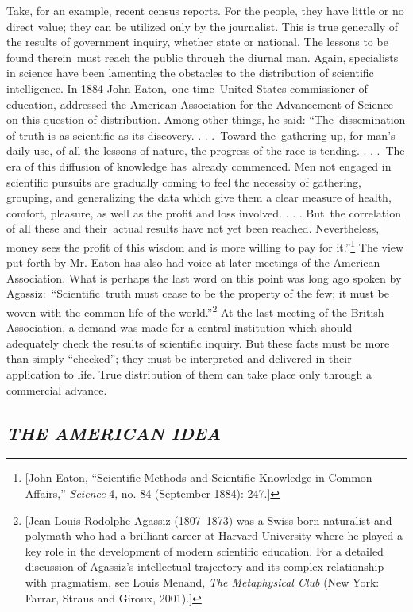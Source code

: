 \documentclass[twoside,symmetric,nobib,justified]{tufte-book}
\begin{document}
Take, for an example, recent census reports. For the people, they have
little or no direct value; they can be utilized only by the journalist.
This is true generally of the results of government inquiry, whether
state or national. The lessons to be found therein~must reach the public
through the diurnal man. Again, specialists in science have been
lamenting the obstacles to the distribution of scientific intelligence.
In 1884 John Eaton,~one time~United States commissioner of education,
addressed the American Association for the Advancement of Science on
this question of distribution. Among other things, he said:
``The~dissemination of truth is as scientific as its discovery. . .
.~Toward the~gathering up, for man's daily use, of all the lessons of
nature, the progress of the race is tending. . . .~The era of this
diffusion of knowledge has~already commenced. Men not engaged in
scientific pursuits are gradually coming to feel the necessity of
gathering, grouping, and generalizing the data which give them a clear
measure of health, comfort, pleasure, as well as the profit and loss
involved. . . . But~the correlation of all these and their~actual
results have not yet been reached. Nevertheless, money sees the profit
of this wisdom and is more willing to pay for it.''\footnote{{[}John
  Eaton, ``Scientific Methods and Scientific Knowledge in Common
  Affairs,'' \emph{Science} 4, no. 84 (September 1884): 247.{]}} The
view put forth by Mr. Eaton has also had voice at later meetings of the
American Association. What is perhaps the last word on this point was
long ago spoken by Agassiz:~``Scientific~truth must cease to be the
property of the few; it must be woven with the common life of the
world.''\footnote{{[}Jean Louis Rodolphe Agassiz (1807--1873) was a
  Swiss-born naturalist and polymath who had a brilliant career at
  Harvard University where he played a key role in the development of
  modern scientific education. For a detailed discussion of Agassiz's
  intellectual trajectory and its complex relationship with pragmatism,
  see Louis Menand, \emph{The Metaphysical Club} (New York: Farrar,
  Straus and Giroux, 2001).{]}} At the last meeting of the British
Association, a demand was made for a central institution which should
adequately check the results of scientific inquiry. But these facts must
be more than simply ``checked''; they must be interpreted and delivered
in their application to life. True distribution of them can take place
only through a commercial advance.~

\hypertarget{the-american-idea}{%
\subsection{\texorpdfstring{\emph{THE AMERICAN
IDEA}}{THE AMERICAN IDEA}}\label{the-american-idea}}
\end{document}
